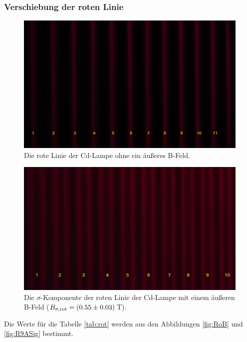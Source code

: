 \subsubsection{Verschiebung der roten Linie}
\begin{figure}[H]
  \centering
  \includegraphics[width=0.8\linewidth]{Bilder/RoB.JPG}
  \caption{Die rote Linie der Cd-Lampe ohne ein äußeres B-Feld.}
  \label{fig:RoB}
\end{figure}

\begin{figure}[H]
  \centering
  \includegraphics[width=0.8\linewidth]{Bilder/R9ASig.JPG}
  \caption{Die $\sigma$-Komponente der roten Linie der Cd-Lampe mit einem äußeren B-Feld ($B_{\sigma,\text{rot}} = (\num{0.55 +- 0.03})$\,T).}
  \label{fig:R9ASig}
\end{figure}

Die Werte für die Tabelle \eqref{tab:rot} werden aus den Abbildungen \eqref{fig:RoB} und \eqref{fig:R9ASig} bestimmt.

